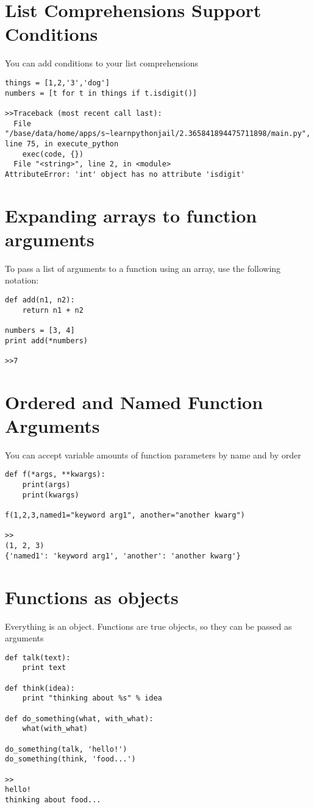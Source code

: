 \documentclass[12pt,a4paper,final,twoside,onecolumn,titlepage]{book}
\begin{document}
\section{List Comprehensions Support Conditions}
You can add conditions to your list comprehensions
\begin{lstlisting}
things = [1,2,'3','dog']
numbers = [t for t in things if t.isdigit()]

>>Traceback (most recent call last):
  File "/base/data/home/apps/s~learnpythonjail/2.365841894475711898/main.py", line 75, in execute_python
    exec(code, {})
  File "<string>", line 2, in <module>
AttributeError: 'int' object has no attribute 'isdigit'
\end{lstlisting}

\section{Expanding arrays to function arguments}
To pass a list of arguments to a function using an array, use the following notation:
\begin{lstlisting}
def add(n1, n2):
    return n1 + n2

numbers = [3, 4]
print add(*numbers)

>>7
\end{lstlisting}

\section{Ordered and Named Function Arguments}
You can accept variable amounts of function parameters by name and by order
\begin{lstlisting}
def f(*args, **kwargs):
    print(args)
    print(kwargs)

f(1,2,3,named1="keyword arg1", another="another kwarg")

>>
(1, 2, 3)
{'named1': 'keyword arg1', 'another': 'another kwarg'}
\end{lstlisting}

\section{Functions as objects}
Everything is an object. Functions are true objects, so they can be passed as arguments
\begin{lstlisting}
def talk(text):
    print text

def think(idea):
    print "thinking about %s" % idea

def do_something(what, with_what):
    what(with_what)

do_something(talk, 'hello!')
do_something(think, 'food...')

>>
hello!
thinking about food...
\end{lstlisting}
\end{document}
